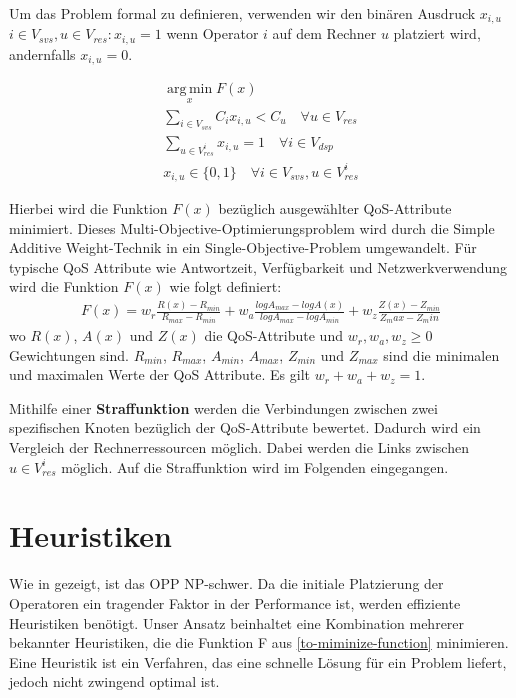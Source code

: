 \documentclass{article}
\begin{document}
Um das Problem formal zu definieren, verwenden wir den binären Ausdruck $x_{i,u}$ $i \in V_{svs}, u \in V_{res}: x_{i,u} = 1$ wenn Operator $i$
auf dem Rechner $u$ platziert wird, andernfalls $x_{i,u} = 0$.

\[ 
    \begin{gathered}
        \operatorname*{arg\,min}_x F(x) \\
        \sum_{i \in V_{svs}} C_i x_{i,u} < C_u \quad \forall u \in V_{res} \\ %
        \sum_{u \in V_{res}^i} x_{i,u} = 1 \quad \forall i \in V_{dsp} \\ %
        x_{i,u} \in \{0,1\} \quad \forall i \in V_{svs}, u \in V_{res}^i
    \end{gathered}
\] 

Hierbei wird die Funktion $F(x)$ bezüglich ausgewählter QoS-Attribute minimiert. 
Dieses Multi-Objective-Optimierungsproblem wird durch die Simple Additive Weight-Technik \cite{yoon-multiple-optimization} in ein Single-Objective-Problem umgewandelt.
Für typische QoS Attribute wie Antwortzeit, Verfügbarkeit und Netzwerkverwendung \cite{efficient-operator-placement} wird die Funktion $F(x)$ wie folgt definiert:
\[ 
    \begin{gathered}
        F(x) = w_r \frac{R(x) - R_{min}}{R_{max} - R_{min}} 
        + w_a \frac{log A_{max} - log A(x)}{log A_{max} - log A_{min}} 
        + w_z \frac{Z(x) - Z_{min}}{Z_max - Z_min} 
    \end{gathered}  \label{to-miminize-function}
\] 
wo $R(x)$, $A(x)$ und $Z(x)$ die QoS-Attribute und $w_r, w_a, w_z \geq 0$ Gewichtungen sind. $R_{min}$, $R_{max}$, $A_{min}$, $A_{max}$, $Z_{min}$ und $Z_{max}$ sind die minimalen und maximalen Werte der QoS Attribute.
Es gilt $w_r + w_a + w_z = 1$.




Mithilfe einer \textbf{Straffunktion} werden die Verbindungen zwischen zwei spezifischen Knoten bezüglich der QoS-Attribute bewertet. Dadurch wird ein Vergleich 
der Rechnerressourcen möglich. Dabei werden die Links zwischen $u \in V_{res}^i$ möglich. Auf die Straffunktion wird im Folgenden eingegangen. 




\section{Heuristiken} \label{Heurisiken}
Wie in \cite{cardellini-optimal_operatorplc} gezeigt, ist das 
OPP NP-schwer.
Da die initiale Platzierung der Operatoren ein tragender Faktor in der Performance ist, werden effiziente Heuristiken benötigt.
Unser Ansatz beinhaltet eine Kombination mehrerer bekannter Heuristiken, die die Funktion F aus \ref{to-miminize-function} minimieren. 
Eine Heuristik ist ein Verfahren, das eine schnelle Lösung für ein Problem liefert, jedoch nicht zwingend optimal ist. 
\end{document}
